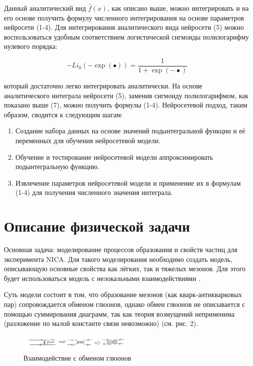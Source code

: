 \documentclass[a4paper,12pt]{article} %
\renewcommand{\figurename}{Рисунок\_}
\begin{document}
Данный аналитический вид $\hat{f}(x)$, как описано выше, можно интегрировать и на его основе получить формулу численного интегрирования на основе параметров нейросети (1-4). Для интегрирования аналитического вида нейросети (5) можно воспользоваться удобным соответствием логистической сигмоиды полилогарифму нулевого порядка:

\begin{equation}
    -Li_0(-\exp(•)) = \frac{1}{1+\exp(-•)}
\end{equation}

\noindent
который достаточно легко интегрировать аналитически. На основе аналитического интеграла нейросети (5), заменив сигмоиду полилогарифмом, как показано выше (7), можно получить формулы (1-4). Нейросетевой подход, таким образом, сводится к следующим шагам:

\begin{enumerate}
    \item Создание набора данных на основе значений подынтегральной функции и её переменных для обучения нейросетевой модели.
    \item Обучение и тестирование нейросетевой модели аппроксимировать подынтегральную функцию.
    \item Извлечение параметров нейросетевой модели и применение их в формулам (1-4) для получения численного значения интеграла.
\end{enumerate}

\section{Описание физической задачи}

Основная задача: моделирование процессов образования и свойств частиц для эксперимента NICA. Для такого моделирования необходимо создать модель, описывающую основные свойства как лёгких, так и тяжелых мезонов. Для этого будет использоваться модель с нелокальными взаимодействиями \cite{blaschke2012meson}\cite{costa2003pseudoscalar}.

Суть модели состоит в том, что образование мезонов (как кварк-антикварковых пар) сопровождается обменом глюонов, однако обмен глюонов не описывается с помощью суммирования диаграмм, так как теория возмущений неприменима (разложение по малой константе связи невозможно) (см. рис. 2).
\renewcommand{\figurename}{Рисунок}
\renewcommand{\thefigure}{2}
\begin{figure}[H]
    \centering
    \includegraphics[width=0.5\textwidth]{interaction.png}
    \caption{Взаимодействие с обменом глюонов}
\end{figure}
\end{document}
